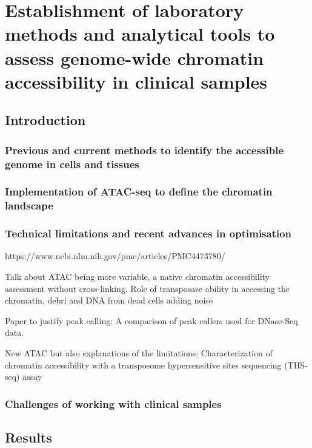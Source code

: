 \chapter{Establishment of laboratory methods and analytical tools to assess genome-wide chromatin accessibility in clinical samples}
\label{ch:Results1}


\section{Introduction}
\subsection*{Previous and current methods to identify the accessible genome in cells and tissues}

\subsection*{Implementation of ATAC-seq to define the chromatin landscape}

\subsection*{Technical limitations and recent advances in optimisation}
https://www.ncbi.nlm.nih.gov/pmc/articles/PMC4473780/

Talk about ATAC being more variable, a native chromatin accessibility assessment without cross-linking. Role of transposase ability in accessing the chromatin, debri and DNA from dead cells adding noise

Paper to justify peak calling: A comparison of peak callers used for DNase-Seq data.

New ATAC but also explanations of the limitations: Characterization of chromatin accessibility with a transposome hypersensitive sites sequencing (THS-seq) assay

\subsection*{Challenges of working with clinical samples}

\section{Results}
%

